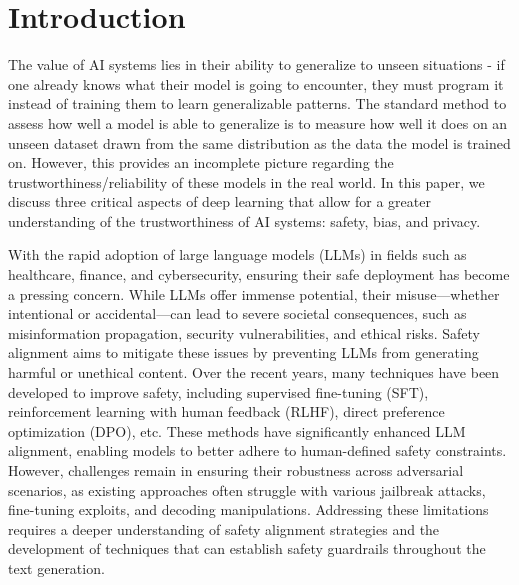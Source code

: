 \section{Introduction}\label{sec:intro}




The value of AI systems lies in their ability to generalize to unseen situations - if one already knows what their model is going to encounter, they must program it instead of training them to learn generalizable patterns. The standard method to assess how well a model is able to generalize is to measure how well it does on an unseen dataset drawn from the same distribution as the data the model is trained on. However, this provides an incomplete picture regarding the trustworthiness/reliability of these models in the real world. In this paper, we discuss three critical aspects of deep learning that allow for a greater understanding of the trustworthiness of AI systems: safety, bias, and privacy.


With the rapid adoption of large language models (LLMs) in fields such as healthcare, finance, and cybersecurity, ensuring their safe deployment has become a pressing concern. While LLMs offer immense potential, their misuse—whether intentional or accidental—can lead to severe societal consequences, such as misinformation propagation, security vulnerabilities, and ethical risks. Safety alignment aims to mitigate these issues by preventing LLMs from generating harmful or unethical content. Over the recent years, many techniques have been developed to improve safety, including supervised fine-tuning (SFT), reinforcement learning with human feedback (RLHF), direct preference optimization (DPO), etc. These methods have significantly enhanced LLM alignment, enabling models to better adhere to human-defined safety constraints. However, challenges remain in ensuring their robustness across adversarial scenarios, as existing approaches often struggle with various jailbreak attacks, fine-tuning exploits, and decoding manipulations. Addressing these limitations requires a deeper understanding of safety alignment strategies and the development of techniques that can establish safety guardrails throughout the text generation.


